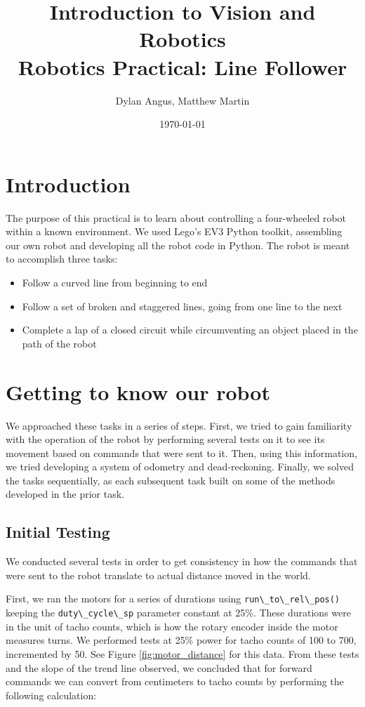 \documentclass[12pt]{article}
\title{Introduction to Vision and Robotics\\Robotics Practical: Line Follower}
\author{Dylan Angus, Matthew Martin}
\date{\today}
\begin{document}
\newcommand{\code}[1]{
	\lstinline[basicstyle=\ttfamily]|#1|
}


\maketitle

\section{Introduction}

The purpose of this practical is to learn about controlling a four-wheeled robot within a known environment. We used Lego's EV3 Python toolkit, assembling our own robot and developing all the robot code in Python. The robot is meant to accomplish three tasks:

\begin{itemize}
	\item Follow a curved line from beginning to end
	\item Follow a set of broken and staggered lines, going from one line to the next
	\item Complete a lap of a closed circuit while circumventing an object placed in the path of the robot
\end{itemize}

\section{Getting to know our robot}

We approached these tasks in a series of steps. First, we tried to gain familiarity with the operation of the robot by performing several tests on it to see its movement based on commands that were sent to it. Then, using this information, we tried developing a system of odometry and dead-reckoning. Finally, we solved the tasks sequentially, as each subsequent task built on some of the methods developed in the prior task.

\subsection{Initial Testing}

We conducted several tests in order to get consistency in how the commands that were sent to the robot translate to actual distance moved in the world.

First, we ran the motors for a series of durations using \code{run\_to\_rel\_pos()} keeping the \code{duty\_cycle\_sp} parameter constant at 25\%. These durations were in the unit of tacho counts, which is how the rotary encoder inside the motor measures turns. We performed tests at 25\% power for tacho counts of 100 to 700, incremented by 50. See Figure \ref{fig:motor_distance} for this data. From these tests and the slope of the trend line observed, we concluded that for forward commands we can convert from centimeters to tacho counts by performing the following calculation:
\end{document}
